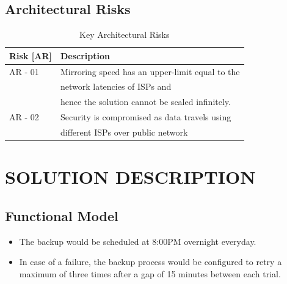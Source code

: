 \documentclass[11pt]{article}
\begin{document}
                                                                                                                                                                                                                                                                                               
\subsection{Architectural Risks}
\label{sec-7.5}



\begin{table}[H]
\caption{\label{tbl:Key Risks}Key Architectural Risks}
\begin{center}
\begin{tabular}{ll}
\hline
 Risk [AR]  &  Description                                      \\
\hline
 AR - 01    &  Mirroring speed has an upper-limit equal to the  \\
            &  network latencies of ISPs and                    \\
            &  hence the solution cannot be scaled infinitely.  \\
 AR - 02    &  Security is compromised as data travels using    \\
            &  different ISPs over public network               \\
\hline
\end{tabular}
\end{center}
\end{table}

                        
\section{SOLUTION DESCRIPTION}
\label{sec-8}

\subsection{Functional Model}
\label{sec-8.1}

\begin{itemize}
\item The backup would be scheduled at 8:00PM overnight everyday.
\item In case of a failure, the backup process would be configured to
     retry a maximum of three times after a gap of 15 minutes between
     each trial.
\end{itemize}
\end{document}
